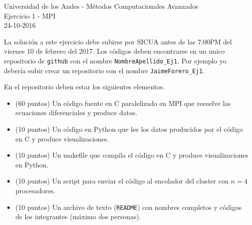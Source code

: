 \documentclass[11pt,letterpaper]{exam}
\begin{document}
\begin{center}
{\Large Universidad de los Andes - M\'etodos Computacionales Avanzados} \\
Ejercicio 1 - \textsc{MPI}\\
24-10-2016\\
\end{center}



\vspace{0.3cm}


\noindent
La solución a este ejercicio debe subirse por SICUA antes de las 7:00PM
del viernes 10 de febrero del 2017. 
Los c\'odigos deben encontrarse en un unico repositorio de \verb'github'
con el nombre \verb"NombreApellido_Ej1". Por ejemplo yo deber\'ia
subir crear un repositorio con el nombre
\verb"JaimeForero_Ej1". 

\noindent
En el repositorio deben estar los siguientes elementos.
\begin{itemize}
\item (60 puntos) Un c\'odigo fuente en C paralelizado en MPI que resuelve las ecuaciones diferenciales y produce datos.
\item (10 puntos) Un c\'odigo en Python que lee los datos producidos por el
  c\'odigo en C y produce visualizaciones.
\item (10 puntos) Un makefile que compila el c\'odigo en C y produce visualizaciones en Python.
\item (10 puntos) Un script para enviar el c\'odigo al encolador del cluster con $n=4$ procesadores.
\item (10 puntos) Un archivo de texto (\verb"README") con nombres completos y c\'odigos de los integrantes (m\'aximo dos personas).
\end{itemize}

\vspace{0.3cm}
\end{document}
